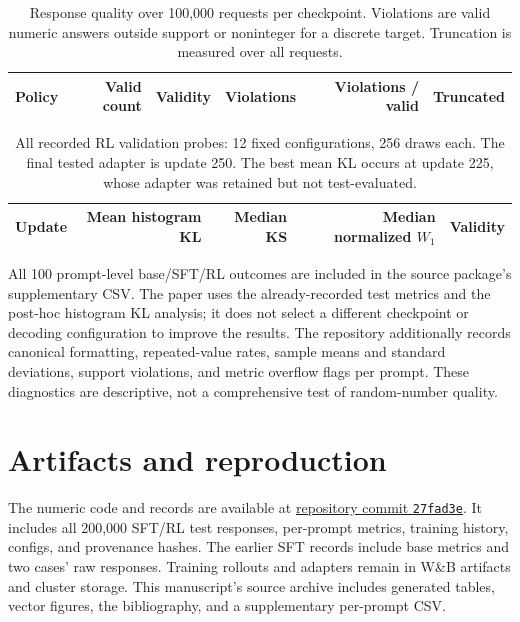\begin{table}[htbp]
\centering\small\setlength{\tabcolsep}{5pt}
\caption{Response quality over 100,000 requests per checkpoint.
Violations are valid numeric answers outside support or noninteger for
a discrete target. Truncation is measured over all requests.}
\label{tab:quality}
\begin{tabular}{@{}lrrrrr@{}}
\toprule
Policy & Valid count & Validity & Violations & Violations / valid & Truncated\\
\midrule

\end{tabular}
\end{table}

\begin{table}[htbp]
\centering\small
\caption{All recorded RL validation probes: 12 fixed configurations,
256 draws each. The final tested adapter is update 250. The best mean KL
occurs at update 225, whose adapter was retained but not test-evaluated.}
\label{tab:validation}
\begin{tabular}{@{}rrrrr@{}}
\toprule
Update & Mean histogram KL & Median KS & Median normalized $W_1$ & Validity\\
\midrule

\end{tabular}
\end{table}

All 100 prompt-level base/SFT/RL outcomes are included in the source
package's supplementary CSV. The paper uses the already-recorded test
metrics and the post-hoc histogram KL analysis; it does not select a
different checkpoint or decoding configuration to improve the results.
The repository additionally records canonical formatting, repeated-value
rates, sample means and standard deviations, support violations, and
metric overflow flags per prompt. These diagnostics are descriptive,
not a comprehensive test of random-number quality.

\FloatBarrier
\section{Artifacts and reproduction}
\label{app:records}
The numeric code and records are available at
\href{https://github.com/YashSolanki2007/llm-random-number-generator/tree/27fad3ec875afb2941f34ab873e8394ae24f25e8}{repository commit \texttt{27fad3e}}.
It includes all 200,000 SFT/RL test responses, per-prompt metrics,
training history, configs, and provenance hashes. The earlier SFT records
include base metrics and two cases' raw responses. Training rollouts and
adapters remain in W\&B artifacts and cluster storage. This manuscript's
source archive includes generated tables, vector figures, the bibliography,
and a supplementary per-prompt CSV.

